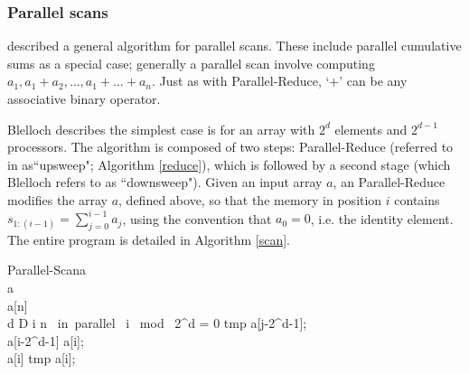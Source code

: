 


\subsubsection{Parallel scans}
\citet{blelloch1990} described a general algorithm for parallel scans. These include parallel cumulative sums as a special case; generally a parallel scan involve computing $a_1,
a_1 + a_2, \ldots, a_1 + \ldots + a_n$. Just as with Parallel-Reduce, `$+$' can be any associative binary operator. 

Blelloch describes the simplest case is for an array with $2^d$ elements and $2^{d-1}$ processors. The algorithm is composed of two steps: Parallel-Reduce (referred to in \cite{blelloch1990} as``upsweep"; Algorithm \ref{reduce}), which is followed by a second stage (which Blelloch refers to as ``downsweep"). Given an input array $a$, an Parallel-Reduce modifies the array $a$, defined above, so that the memory in position $i$ contains $s_{1:(i-1)}=\sum_{j=0}^{i-1}a_j$, using the convention that $a_0=0$, i.e. the identity element. The entire program is detailed in Algorithm \ref{scan}.

\begin{pseudocode}[ruled]{Parallel-Scan}{a}
\label{scan}
\\
a \GETS {}\\
a[n] \\
\FOR d \GETS D  \DO \BEGIN
  \FOR i  \TO n \mbox{ in parallel }\DO \BEGIN
    \IF i \mbox{ mod } 2^{d} = 0 \DO \BEGIN
    tmp \GETS a[j-2^{d-1}];\\
    a[i-2^{d-1}] \GETS a[i];\\
    a[i] \GETS tmp \oplus a[i];
    \END \END \END
{}
\end{pseudocode}




